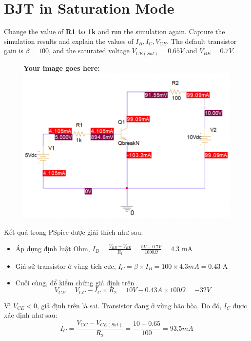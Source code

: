 \section{BJT in Saturation Mode}
Change the value of \textbf{R1 to 1k} and run the simulation again. Capture the simulation results and explain the values of $I_B, I_C, V_{CE}$. The default transistor gain is $\beta = 100$, and the saturated voltage $V_{CE(Sat)} = 0.65V$ and $V_{BE} = 0.7V$.

\begin{figure}[!htbp]
    \centering
    \textbf{Your image goes here:}
    \includegraphics[width=0.8\linewidth]{graphics/ex1/f1.PNG}
\end{figure}
Kết quả trong PSpice được giải thích như sau:

\begin{itemize}
    \item Áp dụng định luật Ohm, $I_B = \frac{V_{BB} - V_{BE}}{R_1} = \frac{5V - 0.7V}{1000\Omega} =  4.3$ mA
    \item Giả sử transistor ở vùng tích cực, $I_C = \beta \times I_B = 100  \times 4.3mA = 0. 43$ A  
    \item Cuối cùng, để kiểm chứng giả định trên $$V_{CE} = V_{CC} - I_C \times R_2 = 10V - 0.43A \times 100\Omega = -32V$$
\end{itemize}

Vì $V_{CE} < 0$, giả định trên là sai. Transistor đang ở vùng bão hòa. Do đó, $I_C$ được xác định như sau:\\

$$I_C = \frac{V_{CC} - V_{CE(Sat)}}{R_2} = \frac{10 - 0.65}{100} = 93.5 mA$$

